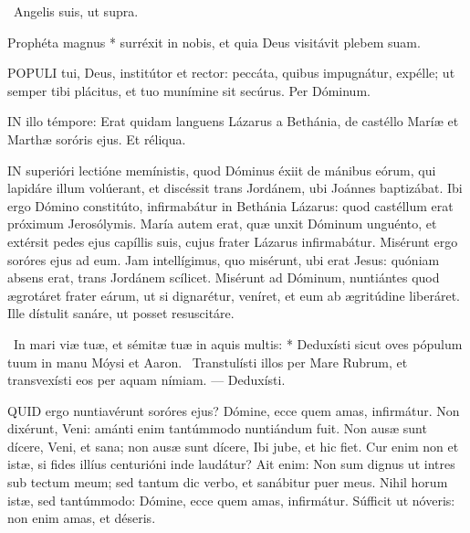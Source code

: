 \V\ Angelis suis, ut supra.

 Prophéta magnus * surréxit in nobis, et quia Deus visitávit plebem suam.


\lettrine[lines=2]{P}{OPULI} tui, Deus, institútor et rector: peccáta, quibus impugnátur, expélle; ut semper tibi plácitus, et tuo munímine sit secúrus. Per Dóminum.

\sectionornament




\lettrine[lines=2]{I}{N} illo témpore: Erat quidam languens Lázarus a Bethánia, de castéllo Maríæ et Marthæ soróris ejus. Et réliqua.



\lettrine[lines=2]{I}{N} superióri lectióne memínistis, quod Dóminus éxiit de mánibus eórum, qui lapidáre illum volúerant, et discéssit trans Jordánem, ubi Joánnes baptizábat. Ibi ergo Dómino constitúto, infirmabátur in Bethánia Lázarus: quod castéllum erat próximum Jerosólymis. María autem erat, quæ unxit Dóminum unguénto, et extérsit pedes ejus capíllis suis, cujus frater Lázarus infirmabátur. Misérunt ergo soróres ejus ad eum. Jam intellígimus, quo misérunt, ubi erat Jesus: quóniam absens erat, trans Jordánem scílicet. Misérunt ad Dóminum, nuntiántes quod ægrotáret frater eárum, ut si dignarétur, veníret, et eum ab ægritúdine liberáret. Ille dístulit sanáre, ut posset resuscitáre.

\R\ In mari viæ tuæ, et sémitæ tuæ in aquis multis: * Deduxísti sicut oves pópulum tuum in manu Móysi et Aaron. \V\ Transtulísti illos per Mare Rubrum, et transvexísti eos per aquam nímiam. --- Deduxísti.


\lettrine[lines=2]{Q}{UID} ergo nuntiavérunt soróres ejus? Dómine, ecce quem amas, infirmátur. Non dixérunt, Veni: amánti enim tantúmmodo nuntiándum fuit. Non ausæ sunt dícere, Veni, et sana; non ausæ sunt dícere, Ibi jube, et hic fiet. Cur enim non et istæ, si fides illíus centurióni inde laudátur? Ait enim: Non sum dignus ut intres sub tectum meum; sed tantum dic verbo, et sanábitur puer meus. Nihil horum istæ, sed tantúmmodo: Dómine, ecce quem amas, infirmátur. Súfficit ut nóveris: non enim amas, et déseris.


